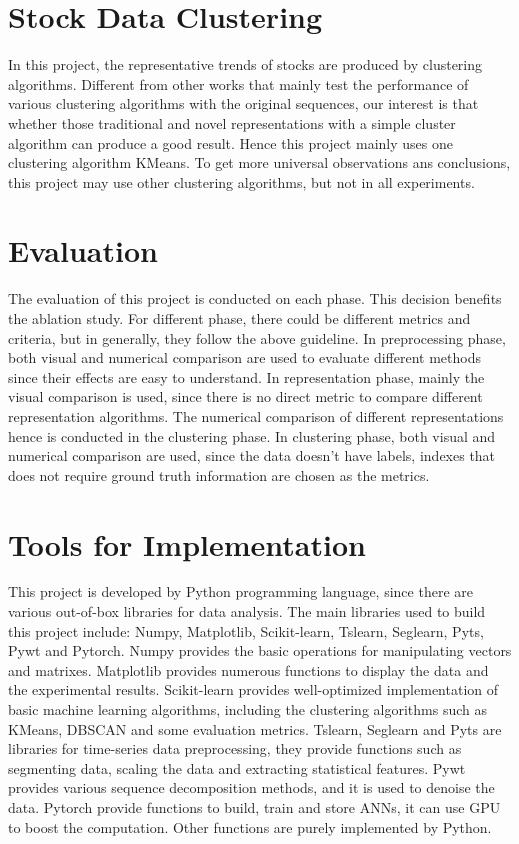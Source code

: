 \section{Stock Data Clustering}
In this project, the representative trends of stocks are produced by clustering algorithms. Different from other works that mainly test the performance of various clustering algorithms with the original sequences, our interest is that whether those traditional and novel representations with a simple cluster algorithm can produce a good result. Hence this project mainly uses one clustering algorithm KMeans. To get more universal observations ans conclusions, this project may use other clustering algorithms, but not in all experiments.



\section{Evaluation}
\label{sec:Evaluation}
The evaluation of this project is conducted on each phase. This decision benefits the ablation study. For different phase, there could be different metrics and criteria, but in generally, they follow the above guideline. In preprocessing phase, both visual and numerical comparison are used to evaluate different methods since their effects are easy to understand. In representation phase, mainly the visual comparison is used, since there is no direct metric to compare different representation algorithms. The numerical comparison of different representations hence is conducted in the clustering phase. In clustering phase, both visual and numerical comparison are used, since the data doesn't have labels, indexes that does not require ground truth information are chosen as the metrics.

\section{Tools for Implementation}
This project is developed by Python programming language, since there are various out-of-box libraries for data analysis. The main libraries used to build this project include: Numpy, Matplotlib, Scikit-learn, Tslearn, Seglearn, Pyts, Pywt and Pytorch. Numpy provides the basic operations for manipulating vectors and matrixes. Matplotlib provides numerous functions to display the data and the experimental results. Scikit-learn provides well-optimized implementation of basic machine learning algorithms, including the clustering algorithms such as KMeans, DBSCAN and some evaluation metrics. Tslearn, Seglearn and Pyts are libraries for time-series data preprocessing, they provide functions such as segmenting data, scaling the data and extracting statistical features. Pywt provides various sequence decomposition methods, and it is used to denoise the data. Pytorch provide functions to build, train and store ANNs, it can use GPU to boost the computation. Other functions are purely implemented by Python.


